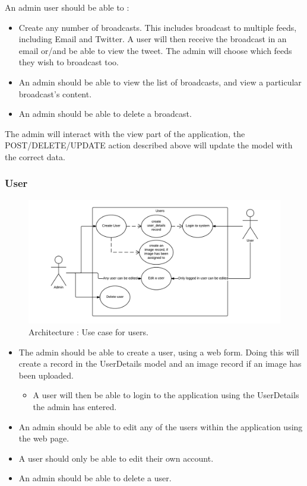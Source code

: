 \documentclass[10pt,a4paper,titlepage]{article}
\begin{document}
An admin user should be able to :
\begin{itemize}
\item Create any number of broadcasts. This includes broadcast to multiple feeds, including Email and Twitter. A user will then receive the broadcast in an email or/and be able to view the tweet. The admin will choose which feeds they wish to broadcast too.
\item An admin should be able to view the list of broadcasts, and view a particular broadcast's content.
\item An admin should be able to delete a broadcast.
\end{itemize}
The admin will interact with the view part of the application, the POST/DELETE/UPDATE action described above will update the model with the correct data.

\subsubsection{User}
\begin{figure}[H]
\begin{center}
\includegraphics[scale=0.3]{include/User_Use_Case.png}  
\caption{Architecture : Use case for users. }
\label{fig:userUseCase}
\end{center}
\end{figure}

\begin{itemize}
\item The admin should be able to create a user, using a web form. Doing this will create a record in the UserDetails model and an image record if an image has been uploaded. 
	\begin{itemize}
	\item A user will then be able to login to the application using the UserDetails the admin has entered.
	\end{itemize} 
\item An admin should be able to edit any of the users within the application using the web page. 
\item A user should only be able to edit their own account.
\item An admin should be able to delete a user.
\end{itemize}
\end{document}

